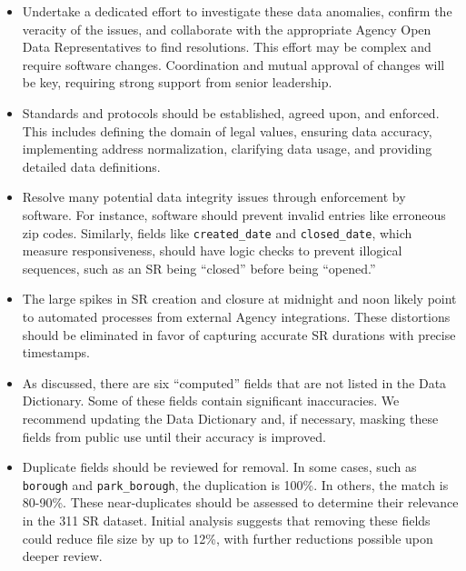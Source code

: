\documentclass[linenumber]{jdsart}
\begin{document}
\begin{itemize}
\item  Undertake a dedicated effort 
    to investigate these data anomalies, confirm the veracity of the 
    issues, and collaborate with the appropriate Agency Open Data 
    Representatives to find resolutions. This effort may be complex 
    and require software changes. Coordination and mutual approval 
    of changes will be key, requiring strong support from senior 
    leadership.

    \item Standards and protocols should be established, agreed upon, 
    and enforced. This includes defining the domain of legal values, 
    ensuring data accuracy, implementing address normalization, 
    clarifying data usage, and providing detailed data definitions.

    \item Resolve many potential data integrity issues
    through enforcement by software. For instance, software should 
    prevent invalid entries like erroneous zip codes. Similarly, fields 
    like \texttt{created\_date} and \texttt{closed\_date}, which 
    measure responsiveness, should have logic checks to prevent 
    illogical sequences, such as an SR being ``closed'' before 
    being ``opened.''

    \item The large spikes in SR creation and closure at midnight and 
    noon likely point to automated processes from external Agency 
    integrations. These distortions should be eliminated in favor of 
    capturing accurate SR durations with precise timestamps.

    \item As discussed, there are six ``computed'' fields that are not 
    listed in the Data Dictionary. Some of these fields contain 
    significant inaccuracies. We recommend updating the Data 
    Dictionary and, if necessary, masking these fields from public use 
    until their accuracy is improved.

    \item Duplicate fields should be reviewed for removal. In some 
    cases, such as \texttt{borough} and \texttt{park\_borough}, the 
    duplication is 100\%. In others, the match is 80-90\%. 
    These near-duplicates should be assessed to determine their 
    relevance in the 311 SR dataset. Initial analysis suggests that 
    removing these fields could reduce file size by up to 12\%, with 
    further reductions possible upon deeper review.


\end{itemize}
\end{document}
